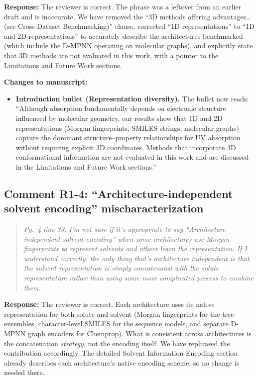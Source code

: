 \documentclass[11pt]{article}
\newenvironment{reviewer}{%
  \begin{quote}\itshape\color{black!70}}{%
  \end{quote}}
\newcommand{\response}[1]{\noindent\textbf{Response:} #1\par\medskip}
\newenvironment{changes}{%
  \noindent\textbf{Changes to manuscript:}
  \begin{itemize}[leftmargin=2em,itemsep=2pt]}{%
  \end{itemize}\medskip}
\begin{document}
\response{The reviewer is correct. The phrase was a leftover from an earlier draft and is inaccurate. We have removed the ``3D methods offering advantages\ldots (see Cross-Dataset Benchmarking)'' clause, corrected ``1D representations'' to ``1D and 2D representations'' to accurately describe the architectures benchmarked (which include the D-MPNN operating on molecular graphs), and explicitly state that 3D methods are not evaluated in this work, with a pointer to the Limitations and Future Work sections.}

\begin{changes}
  \item \textbf{Introduction bullet (Representation diversity).} The bullet now reads: ``Although absorption fundamentally depends on electronic structure influenced by molecular geometry, our results show that 1D and 2D representations (Morgan fingerprints, SMILES strings, molecular graphs) capture the dominant structure--property relationships for UV absorption without requiring explicit 3D coordinates. Methods that incorporate 3D conformational information are not evaluated in this work and are discussed in the Limitations and Future Work sections.''
\end{changes}

\subsection*{Comment R1-4: ``Architecture-independent solvent encoding'' mischaracterization}
\begin{reviewer}
Pg.\ 4 line 33: I'm not sure if it's appropriate to say ``Architecture-independent solvent encoding'' when some architectures use Morgan fingerprints to represent solvents and others learn the representation. If I understand correctly, the only thing that's architecture independent is that the solvent representation is simply concatenated with the solute representation rather than using some more complicated process to combine them.
\end{reviewer}

\response{The reviewer is correct. Each architecture uses its native representation for both solute and solvent (Morgan fingerprints for the tree ensembles, character-level SMILES for the sequence models, and separate D-MPNN graph encoders for Chemprop). What is consistent across architectures is the concatenation \emph{strategy}, not the encoding itself. We have rephrased the contribution accordingly. The detailed Solvent Information Encoding section already describes each architecture's native encoding scheme, so no change is needed there.}
\end{document}
